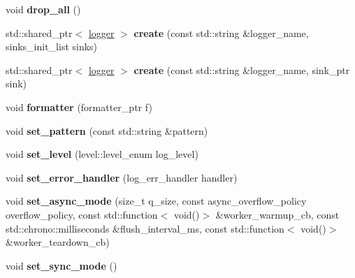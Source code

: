\begin{DoxyCompactItemize}
\item 
void {\bfseries drop\+\_\+all} ()\hypertarget{classspdlog_1_1details_1_1registry__t_acd8ee16fd87c4f976a5728d4138acb2c}{}\label{classspdlog_1_1details_1_1registry__t_acd8ee16fd87c4f976a5728d4138acb2c}

\item 
std\+::shared\+\_\+ptr$<$ \hyperlink{classspdlog_1_1logger}{logger} $>$ {\bfseries create} (const std\+::string \&logger\+\_\+name, sinks\+\_\+init\+\_\+list sinks)\hypertarget{classspdlog_1_1details_1_1registry__t_ae3da0fbf3566bc5d6a27ec6a96f8c270}{}\label{classspdlog_1_1details_1_1registry__t_ae3da0fbf3566bc5d6a27ec6a96f8c270}

\item 
std\+::shared\+\_\+ptr$<$ \hyperlink{classspdlog_1_1logger}{logger} $>$ {\bfseries create} (const std\+::string \&logger\+\_\+name, sink\+\_\+ptr sink)\hypertarget{classspdlog_1_1details_1_1registry__t_acc516bff6719f15c33760d7771c70997}{}\label{classspdlog_1_1details_1_1registry__t_acc516bff6719f15c33760d7771c70997}

\item 
void {\bfseries formatter} (formatter\+\_\+ptr f)\hypertarget{classspdlog_1_1details_1_1registry__t_a23ab301e7663abdb8cc8ce1009450c7a}{}\label{classspdlog_1_1details_1_1registry__t_a23ab301e7663abdb8cc8ce1009450c7a}

\item 
void {\bfseries set\+\_\+pattern} (const std\+::string \&pattern)\hypertarget{classspdlog_1_1details_1_1registry__t_a96c915001a1b6c5656af1fd560fdec16}{}\label{classspdlog_1_1details_1_1registry__t_a96c915001a1b6c5656af1fd560fdec16}

\item 
void {\bfseries set\+\_\+level} (level\+::level\+\_\+enum log\+\_\+level)\hypertarget{classspdlog_1_1details_1_1registry__t_aabdbf66a65e1026e5e0dcbea877ff3ef}{}\label{classspdlog_1_1details_1_1registry__t_aabdbf66a65e1026e5e0dcbea877ff3ef}

\item 
void {\bfseries set\+\_\+error\+\_\+handler} (log\+\_\+err\+\_\+handler handler)\hypertarget{classspdlog_1_1details_1_1registry__t_a8cc9acbfcef9943cbff6611930d6c48c}{}\label{classspdlog_1_1details_1_1registry__t_a8cc9acbfcef9943cbff6611930d6c48c}

\item 
void {\bfseries set\+\_\+async\+\_\+mode} (size\+\_\+t q\+\_\+size, const async\+\_\+overflow\+\_\+policy overflow\+\_\+policy, const std\+::function$<$ void()$>$ \&worker\+\_\+warmup\+\_\+cb, const std\+::chrono\+::milliseconds \&flush\+\_\+interval\+\_\+ms, const std\+::function$<$ void()$>$ \&worker\+\_\+teardown\+\_\+cb)\hypertarget{classspdlog_1_1details_1_1registry__t_a0b2fec9af99edf72e3bc60a69fde5ba6}{}\label{classspdlog_1_1details_1_1registry__t_a0b2fec9af99edf72e3bc60a69fde5ba6}

\item 
void {\bfseries set\+\_\+sync\+\_\+mode} ()\hypertarget{classspdlog_1_1details_1_1registry__t_ad4aa99fcb43a890d9c64f8b0a88b829c}{}\label{classspdlog_1_1details_1_1registry__t_ad4aa99fcb43a890d9c64f8b0a88b829c}

\end{DoxyCompactItemize}
